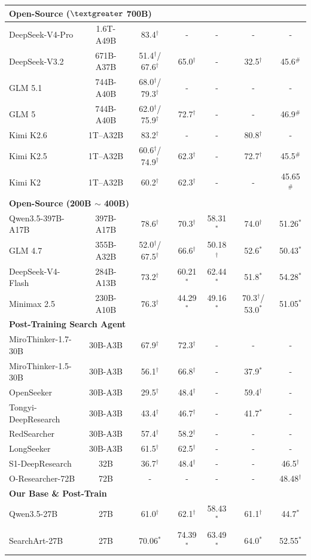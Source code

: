 \documentclass{huawei}
\begin{document}
\begin{table}[!t]
\begin{tabular}{l c c c c c c}
\midrule
\multicolumn{7}{l}{\textbf{Open-Source ($\textgreater$ 700B)}} \\
\midrule
DeepSeek-V4-Pro & 1.6T-A49B & 83.4$^\dagger$ & - & - & - & -  \\
DeepSeek-V3.2 & 671B-A37B & 51.4$^\dagger$/ 67.6$^\dagger$ & 65.0$^\dagger$ & - & 32.5$^\dagger$ & 45.6$^\#$ \\
GLM 5.1 & 744B-A40B & 68.0$^\dagger$/ 79.3$^\dagger$ & - & - & -  & -   \\
GLM 5 & 744B-A40B &  62.0$^\dagger$/ 75.9$^\dagger$ & 72.7$^\dagger$ & - & - & 46.9$^\#$ \\
Kimi K2.6 & 1T–A32B & 83.2$^\dagger$ & - & - & 80.8$^\dagger$ & -  \\
Kimi K2.5 & 1T–A32B & 60.6$^\dagger$/ 74.9$^\dagger$ & 62.3$^\dagger$ & - & 72.7$^\dagger$ & 45.5$^\#$  \\
Kimi K2 & 1T–A32B & 60.2$^\dagger$ & 62.3$^\dagger$ & - & - & 45.65$^\#$  \\
\midrule
\multicolumn{7}{l}{\textbf{Open-Source (200B $\sim$ 400B)}} \\
\midrule
Qwen3.5-397B-A17B & 397B-A17B & 78.6$^\dagger$ & 70.3$^\dagger$ & 58.31$^*$ & 74.0$^\dagger$ & 51.26$^*$  \\
GLM 4.7 & 355B-A32B & 52.0$^\dagger$/ 67.5$^\dagger$  & 66.6$^\dagger$ & 50.18$^\dagger$ & 52.6$^*$ & 50.43$^*$  \\
DeepSeek-V4-Flash & 284B-A13B & 73.2$^\dagger$ & 60.21$^*$ & 62.44$^*$ & 51.8$^*$ & 54.28$^*$  \\
Minimax 2.5 & 230B-A10B & 76.3$^\dagger$ & 44.29$^*$ & 49.16$^*$ & 70.3$^\dagger$/ 53.0$^*$ & 51.05$^*$  \\
\midrule
\multicolumn{7}{l}{\textbf{Post-Training Search Agent}} \\
\midrule
MiroThinker-1.7-30B & 30B-A3B & 67.9$^\dagger$ & 72.3$^\dagger$ & - & - & - \\
MiroThinker-1.5-30B & 30B-A3B & 56.1$^\dagger$ & 66.8$^\dagger$ & - & 37.9$^*$ & - \\
OpenSeeker & 30B-A3B & 29.5$^\dagger$ & 48.4$^\dagger$ & - & 59.4$^\dagger$ & - \\
Tongyi-DeepResearch & 30B-A3B & 43.4$^\dagger$ & 46.7$^\dagger$ & - & 41.7$^*$ & - \\
RedSearcher & 30B-A3B & 57.4$^\dagger$ & 58.2$^\dagger$ & - & - & - \\
LongSeeker & 30B-A3B & 61.5$^\dagger$ & 62.5$^\dagger$ & - & - & - \\
S1-DeepResearch & 32B & 36.7$^\dagger$ & 48.4$^\dagger$ & - & - & 46.5$^\dagger$ \\
O-Researcher-72B & 72B & - & - & - & - & 48.48$^\dagger$ \\
\midrule
\multicolumn{7}{l}{\textbf{Our Base \& Post-Train}} \\
\midrule
Qwen3.5-27B & 27B & 61.0$^\dagger$ & 62.1$^\dagger$ & 58.43$^*$ & 61.1$^\dagger$ & 44.7$^*$  \\
\rowcolor{lightblue}
SearchArt-27B & 27B & 70.06$^*$ & 74.39$^*$ & 63.49$^*$ & 64.0$^*$ & 52.55$^*$ \\ 
\bottomrule
\end{tabular}
\label{table:main}
\end{table}
\end{document}

